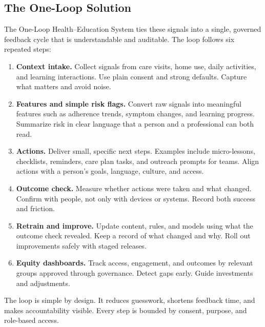 \documentclass[12pt]{article}
\begin{document}
\subsection*{The One-Loop Solution}
The One-Loop Health–Education System ties these signals into a single, governed feedback cycle that is understandable and auditable. The loop follows six repeated steps:
\begin{enumerate}[leftmargin=*]
  \item \textbf{Context intake.} Collect signals from care visits, home use, daily activities, and learning interactions. Use plain consent and strong defaults. Capture what matters and avoid noise.
  \item \textbf{Features and simple risk flags.} Convert raw signals into meaningful features such as adherence trends, symptom changes, and learning progress. Summarize risk in clear language that a person and a professional can both read.
  \item \textbf{Actions.} Deliver small, specific next steps. Examples include micro-lessons, checklists, reminders, care plan tasks, and outreach prompts for teams. Align actions with a person’s goals, language, culture, and access.
  \item \textbf{Outcome check.} Measure whether actions were taken and what changed. Confirm with people, not only with devices or systems. Record both success and friction.
  \item \textbf{Retrain and improve.} Update content, rules, and models using what the outcome check revealed. Keep a record of what changed and why. Roll out improvements safely with staged releases.
  \item \textbf{Equity dashboards.} Track access, engagement, and outcomes by relevant groups approved through governance. Detect gaps early. Guide investments and adjustments.
\end{enumerate}
The loop is simple by design. It reduces guesswork, shortens feedback time, and makes accountability visible. Every step is bounded by consent, purpose, and role-based access.
\end{document}
